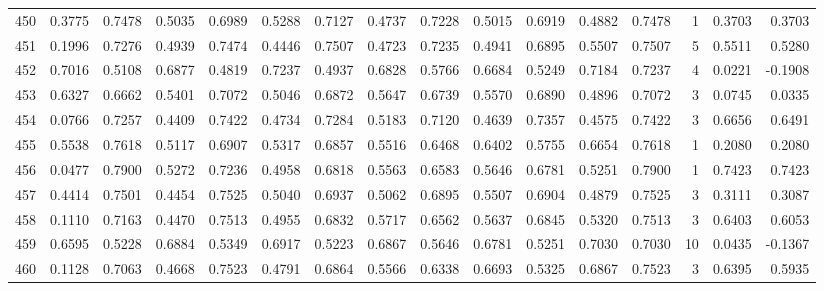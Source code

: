 \begin{tabular}{lrrrrrrrrrrrrrrr}
450 &      0.3775 &  0.7478 &  0.5035 &  0.6989 &  0.5288 &  0.7127 &  0.4737 &  0.7228 &  0.5015 &  0.6919 &   0.4882 &     0.7478 &      1 &                    0.3703 &                     0.3703 \\
451 &      0.1996 &  0.7276 &  0.4939 &  0.7474 &  0.4446 &  0.7507 &  0.4723 &  0.7235 &  0.4941 &  0.6895 &   0.5507 &     0.7507 &      5 &                    0.5511 &                     0.5280 \\
452 &      0.7016 &  0.5108 &  0.6877 &  0.4819 &  0.7237 &  0.4937 &  0.6828 &  0.5766 &  0.6684 &  0.5249 &   0.7184 &     0.7237 &      4 &                    0.0221 &                    -0.1908 \\
453 &      0.6327 &  0.6662 &  0.5401 &  0.7072 &  0.5046 &  0.6872 &  0.5647 &  0.6739 &  0.5570 &  0.6890 &   0.4896 &     0.7072 &      3 &                    0.0745 &                     0.0335 \\
454 &      0.0766 &  0.7257 &  0.4409 &  0.7422 &  0.4734 &  0.7284 &  0.5183 &  0.7120 &  0.4639 &  0.7357 &   0.4575 &     0.7422 &      3 &                    0.6656 &                     0.6491 \\
455 &      0.5538 &  0.7618 &  0.5117 &  0.6907 &  0.5317 &  0.6857 &  0.5516 &  0.6468 &  0.6402 &  0.5755 &   0.6654 &     0.7618 &      1 &                    0.2080 &                     0.2080 \\
456 &      0.0477 &  0.7900 &  0.5272 &  0.7236 &  0.4958 &  0.6818 &  0.5563 &  0.6583 &  0.5646 &  0.6781 &   0.5251 &     0.7900 &      1 &                    0.7423 &                     0.7423 \\
457 &      0.4414 &  0.7501 &  0.4454 &  0.7525 &  0.5040 &  0.6937 &  0.5062 &  0.6895 &  0.5507 &  0.6904 &   0.4879 &     0.7525 &      3 &                    0.3111 &                     0.3087 \\
458 &      0.1110 &  0.7163 &  0.4470 &  0.7513 &  0.4955 &  0.6832 &  0.5717 &  0.6562 &  0.5637 &  0.6845 &   0.5320 &     0.7513 &      3 &                    0.6403 &                     0.6053 \\
459 &      0.6595 &  0.5228 &  0.6884 &  0.5349 &  0.6917 &  0.5223 &  0.6867 &  0.5646 &  0.6781 &  0.5251 &   0.7030 &     0.7030 &     10 &                    0.0435 &                    -0.1367 \\
460 &      0.1128 &  0.7063 &  0.4668 &  0.7523 &  0.4791 &  0.6864 &  0.5566 &  0.6338 &  0.6693 &  0.5325 &   0.6867 &     0.7523 &      3 &                    0.6395 &                     0.5935 \\

\end{tabular}
